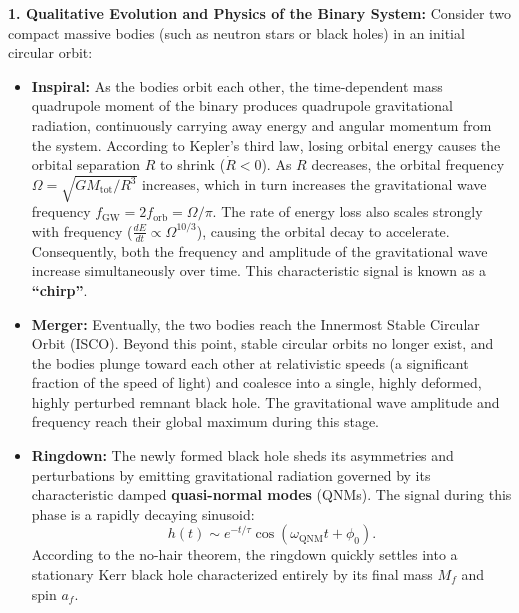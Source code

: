 \documentclass[12pt]{article}
\begin{document}
\begin{enumerate}[label=\alph*)]
\vspace{0.5em}
\noindent\textbf{1. Qualitative Evolution and Physics of the Binary System:}
Consider two compact massive bodies (such as neutron stars or black holes) in an initial circular orbit:
\begin{itemize}
\item \textbf{Inspiral:} 
As the bodies orbit each other, the time-dependent mass quadrupole moment of the binary produces quadrupole gravitational radiation, continuously carrying away energy and angular momentum from the system. 
According to Kepler's third law, losing orbital energy causes the orbital separation $R$ to shrink ($\dot{R} < 0$). 
As $R$ decreases, the orbital frequency $\Omega = \sqrt{G M_{\text{tot}}/R^3}$ increases, which in turn increases the gravitational wave frequency $f_{\text{GW}} = 2 f_{\text{orb}} = \Omega / \pi$. 
The rate of energy loss also scales strongly with frequency ($\frac{dE}{dt} \propto \Omega^{10/3}$), causing the orbital decay to accelerate. Consequently, both the frequency and amplitude of the gravitational wave increase simultaneously over time. This characteristic signal is known as a \textbf{``chirp''}.

\item \textbf{Merger:} 
Eventually, the two bodies reach the Innermost Stable Circular Orbit (ISCO). Beyond this point, stable circular orbits no longer exist, and the bodies plunge toward each other at relativistic speeds (a significant fraction of the speed of light) and coalesce into a single, highly deformed, highly perturbed remnant black hole. The gravitational wave amplitude and frequency reach their global maximum during this stage.

\item \textbf{Ringdown:} 
The newly formed black hole sheds its asymmetries and perturbations by emitting gravitational radiation governed by its characteristic damped \textbf{quasi-normal modes} (QNMs). The signal during this phase is a rapidly decaying sinusoid:
\begin{equation}
h(t) \sim e^{-t/\tau} \cos(\omega_{\text{QNM}} t + \phi_0).
\end{equation}
According to the no-hair theorem, the ringdown quickly settles into a stationary Kerr black hole characterized entirely by its final mass $M_f$ and spin $a_f$.
\end{itemize}


\end{enumerate}
\end{document}
